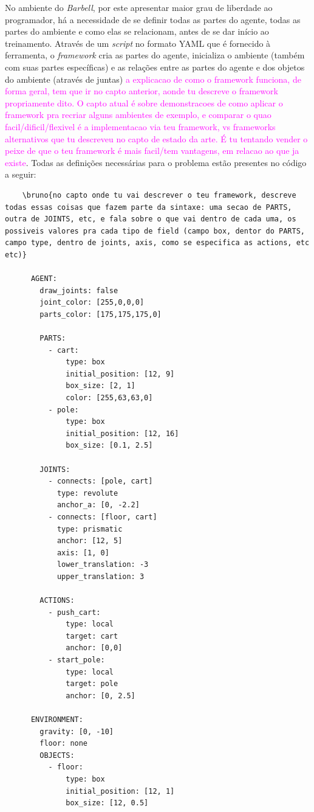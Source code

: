 \documentclass[cic,tc]{iiufrgs}
\newcommand\bruno[1]{\textcolor{magenta}{#1}}
\begin{document}
    No ambiente do \textit{Barbell}, por este apresentar maior grau de liberdade ao programador, há a necessidade de se
    definir todas as partes do agente, todas as partes do ambiente e como elas se relacionam, antes de se dar início ao
    treinamento. Através de um \textit{script} no formato YAML que é fornecido à ferramenta, o \textit{framework} cria
    as partes do agente, inicializa o ambiente (também com suas partes específicas) e as relações entre as partes do agente e
    dos objetos do ambiente (através de juntas) \bruno{a explicacao de como o framework funciona, de forma geral, tem que ir no capto anterior, aonde tu descreve o framework propriamente dito. O capto atual é sobre demonstracoes de como aplicar o framework pra recriar alguns ambientes de exemplo, e comparar o quao facil/dificil/flexivel é a implementacao via teu framework, vs frameworks alternativos que tu descreveu no capto de estado da arte. É tu tentando vender o peixe de que o teu framework é mais facil/tem vantagens, em relacao ao que ja existe}. Todas as definições necessárias para o problema estão presentes no código a seguir:
    
    \begin{verbatim}
    \bruno{no capto onde tu vai descrever o teu framework, descreve todas essas coisas que fazem parte da sintaxe: uma secao de PARTS, outra de JOINTS, etc, e fala sobre o que vai dentro de cada uma, os possiveis valores pra cada tipo de field (campo box, dentor do PARTS, campo type, dentro de joints, axis, como se especifica as actions, etc etc)}
    
      AGENT:
        draw_joints: false
        joint_color: [255,0,0,0]
        parts_color: [175,175,175,0]
    
        PARTS:
          - cart:
              type: box
              initial_position: [12, 9]
              box_size: [2, 1]
              color: [255,63,63,0]
          - pole:
              type: box
              initial_position: [12, 16]
              box_size: [0.1, 2.5]
    
        JOINTS:
          - connects: [pole, cart]
            type: revolute
            anchor_a: [0, -2.2]
          - connects: [floor, cart]
            type: prismatic
            anchor: [12, 5]
            axis: [1, 0]
            lower_translation: -3
            upper_translation: 3
    
        ACTIONS:
          - push_cart:
              type: local
              target: cart
              anchor: [0,0]
          - start_pole:
              type: local
              target: pole
              anchor: [0, 2.5]
    
      ENVIRONMENT:
        gravity: [0, -10]
        floor: none
        OBJECTS:
          - floor:
              type: box
              initial_position: [12, 1]
              box_size: [12, 0.5]
    \end{verbatim}
    
\end{document}
